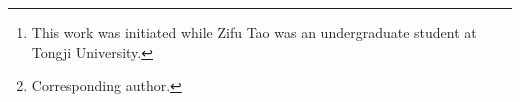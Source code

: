 \author{%
  Zifu Tao\thanks{This work was initiated while Zifu Tao was an undergraduate student at Tongji University.}\\
  Tongji University\\
  \href{mailto:zifutao@nyu.edu}{zifutao@nyu.edu}
  \And
  Changqing Yin\thanks{Corresponding author.}\\
  Tongji University\\
  \href{mailto:yinchangqing@tongji.edu.cn}{yinchangqing@tongji.edu.cn}
}

\newcommand{\researchoriginfootnote}{}
